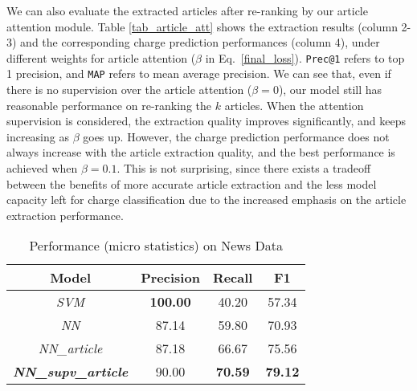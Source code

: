 We can also evaluate the extracted articles after re-ranking by our article attention module.
Table \ref{tab_article_att} shows the extraction results  (column 2-3) and the corresponding charge prediction performances (column 4), under different weights for article attention ($\beta$ in Eq.~\ref{final_loss}). \texttt{Prec@1} refers to top 1 precision, and \texttt{MAP} refers to mean average precision.
%
We can see that, even if there is no supervision over the article attention ($\beta=0$), our model still has reasonable performance on re-ranking the $k$ articles. When the attention supervision is considered, the extraction quality improves significantly, and keeps increasing as $\beta$ goes up.
However, the charge prediction performance does not always increase with the article extraction quality, and the best performance is achieved when $\beta=0.1$. This is not surprising, since  there exists a tradeoff between the benefits of more accurate article extraction and the less model capacity left for charge classification due to the increased emphasis on the article extraction performance.

\begin{table}
\centering
\small{
\begin{tabular}{|c|c|c|c|}
\hline
\textbf{Model}												& \textbf{Precision} 				& \textbf{Recall} 				& \textbf{F1} 	\\
\hline
\textit{SVM} 													& \textbf{100.00}						& 40.20  									& 57.34 				 	\\
\hline
\textit{NN}														& 87.14											& 59.80 									& 70.93					\\
\hline
\textit{NN\_article}					& 87.18											& 66.67 									& 75.56					\\
\hline
\textbf{\textit{NN\_supv\_article}} 	& 90.00 										& \textbf{70.59} 					& \textbf{79.12} 		 	\\
\hline
\end{tabular}
}
\caption{Performance (micro statistics) on News Data}
\label{tabble_news_results}
\end{table}

